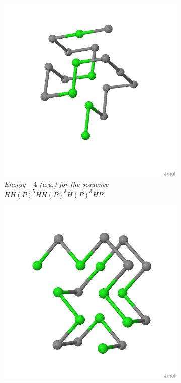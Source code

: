 \begin{figure}[H]
    \centering
    \begin{subfigure}[b]{0.45\textwidth}
        \centering
        \includegraphics[width=\textwidth]{./img/18_3D.png}
        \caption{\emph{Energy $-4$ (a.u.) for the sequence $HH(P)^5HH(P)^3H(P)^3HP$.}}
    \end{subfigure}
    \begin{subfigure}[b]{0.45\textwidth}
        \centering
        \includegraphics[width=\textwidth]{./img/20_3D.png}

\end{subfigure}
\end{figure}
